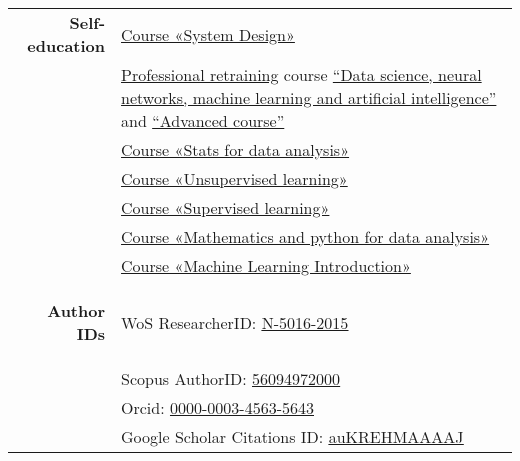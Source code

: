 \documentclass[11pt]{article}
\begin{document}
	\begin{longtable} {r | p{}}
		\textbf{Self-education}
		& 
		\href{https://lab.karpov.courses/certificate/752f8aad-7f6e-40ad-98c2-12efe12bc0b7/en/}{Course «System Design»}\\
		&
		\href{https://disk.yandex.ru/i/H5-s3Lw6j-1wkg}{Professional retraining} course \href{https://disk.yandex.ru/i/UO1qC0H4FCa8LQ}{\textquotedblleft Data science, neural networks, machine learning and artificial intelligence\textquotedblright} \cite{inpainting} and \href{https://disk.yandex.ru/i/t3yNB56C3nNo5A}{\textquotedblleft Advanced course\textquotedblright}\\
		&  \href{https://www.coursera.org/account/accomplishments/certificate/DMUZAUCWBQG4}{Course «Stats for data analysis»}\\
		& \href{https://www.coursera.org/account/accomplishments/certificate/H8BWKAK4Y96D}{Course «Unsupervised learning»}\\
		& \href{https://www.coursera.org/account/accomplishments/certificate/9GQC5C4UP9YB}{Course «Supervised learning»}\\
		& \href{https://www.coursera.org/account/accomplishments/certificate/2AZHZW96LJ2N}{Course «Mathematics and python for data analysis»}\\
		\vspace{1em} & 
		\href{https://www.coursera.org/account/accomplishments/certificate/6K5Z2UFA5887}{Course «Machine Learning Introduction»}\\
		
		\hypertarget{AutorIDs}{\textbf{Author IDs}} & WoS ResearcherID: \href{https://publons.com/researcher/2345963/nikita-y-shubin/}{\underline{N-5016-2015}}\\
		& Scopus AuthorID: \href{https://www.scopus.com/authid/detail.uri?authorId=56094972000}{\underline{56094972000}}\\
		& Orcid: \href{https://orcid.org/0000-0003-4563-5643}{\underline{0000-0003-4563-5643}}\\
		& Google Scholar Citations ID: \href{https://scholar.google.com/citations?user=auKREHMAAAAJ}{\underline{auKREHMAAAAJ}}
	\end{longtable}
	
	
\end{document}
